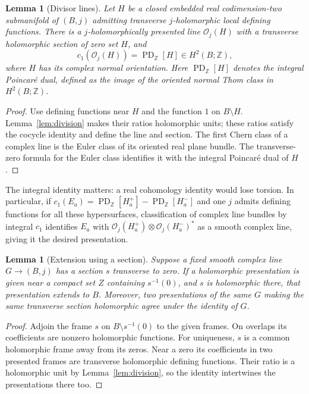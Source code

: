 \documentclass[11pt]{article}
\newtheorem{lemma}[theorem]{Lemma}
\theoremstyle{definition}
\theoremstyle{remark}
\newcommand{\Z}{\mathbb Z}
\newcommand{\PD}{\operatorname{PD}_{\Z}}
\newcommand{\cO}{\mathcal O}
\begin{document}
\begin{lemma}[Divisor lines]\label{lem:divisorline}
Let $H$ be a closed embedded real codimension-two submanifold of $(B,j)$ admitting transverse $j$-holomorphic local defining functions. There is a $j$-holomorphically presented line $\cO_j(H)$ with a transverse holomorphic section of zero set $H$, and
\[
 c_1(\cO_j(H))=\PD[H]\in H^2(B;\Z),
\]
where $H$ has its complex normal orientation. Here $\PD[H]$ denotes the integral Poincar\'e dual, defined as the image of the oriented normal Thom class in $H^2(B;\Z)$.
\end{lemma}
\begin{proof}
Use defining functions near $H$ and the function $1$ on $B\setminus H$. Lemma~\ref{lem:division} makes their ratios holomorphic units; these ratios satisfy the cocycle identity and define the line and section. The first Chern class of a complex line is the Euler class of its oriented real plane bundle. The transverse-zero formula for the Euler class identifies it with the integral Poincar\'e dual of $H$.
\end{proof}

The integral identity matters: a real cohomology identity would lose torsion. In particular, if
$c_1(E_a)=\PD[H_a^+]-\PD[H_a^-]$ and one $j$ admits defining functions for all these hypersurfaces, classification of complex line bundles by integral $c_1$ identifies $E_a$ with
$\cO_j(H_a^+)\otimes\cO_j(H_a^-)^*$ as a smooth complex line, giving it the desired presentation.


\begin{lemma}[Extension using a section]\label{lem:section}
Suppose a fixed smooth complex line $G\to(B,j)$ has a section $s$ transverse to zero. If a holomorphic presentation is given near a compact set $Z$ containing $s^{-1}(0)$, and $s$ is holomorphic there, that presentation extends to $B$. Moreover, two presentations of the same $G$ making the same transverse section holomorphic agree under the identity of $G$.
\end{lemma}
\begin{proof}
Adjoin the frame $s$ on $B\setminus s^{-1}(0)$ to the given frames. On overlaps its coefficients are nonzero holomorphic functions. For uniqueness, $s$ is a common holomorphic frame away from its zeros. Near a zero its coefficients in two presented frames are transverse holomorphic defining functions. Their ratio is a holomorphic unit by Lemma~\ref{lem:division}, so the identity intertwines the presentations there too.
\end{proof}
\end{document}
